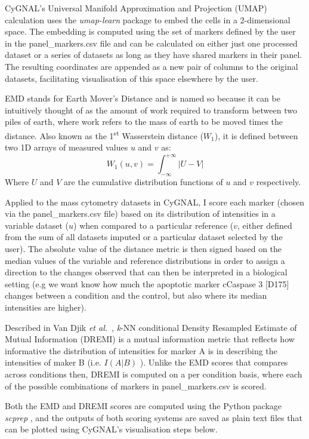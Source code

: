 CyGNAL’s Universal Manifold Approximation and Projection (UMAP) calculation uses the \emph{umap-learn} package \cite{mcinnes_umap_2020} to embed the cells in a 2-dimensional space. The embedding is computed using the set of markers defined by the user in the panel\_markers.csv file and can be calculated on either just one processed dataset or a series of datasets as long as they have shared markers in their panel. The resulting coordinates are appended as a new pair of columns to the original datasets, facilitating visualisation of this space elsewhere by the user.

EMD stands for Earth Mover's Distance and is named so because it can be intuitively thought of as the amount of work required to transform between two piles of earth, where work refers to the mass of earth to be moved times the distance. Also known as the 1\textsuperscript{st} Wasserstein distance (\(W_1\)), it is defined between two 1D arrays of measured values \(u\) and \(v\) as:
\[W_1(u, v) = \int_{-\infty}^{+\infty} |U-V|\]
Where \(U\) and \(V\) are the cumulative distribution functions of \(u\) and \(v\) respectively.

Applied to the mass cytometry datasets in CyGNAL, I score each marker (chosen via the panel\_markers.csv file) based on its distribution of intensities in a variable dataset (\(u\)) when compared to a particular reference (\(v\), either defined from the sum of all datasets imputed or a particular dataset selected by the user). The absolute value of the distance metric is then signed based on the median values of the variable and reference distributions in order to assign a direction to the changes observed that can then be interpreted in a biological setting (e.g we want know how much the apoptotic marker cCaspase 3 [D175] changes between a condition and the control, but also where its median intensities are higher).

Described in Van Djik \emph{et al.}~\cite{van_dijk_recovering_2018}, \emph{k}-NN conditional Density Resampled Estimate of Mutual Information (DREMI) is a mutual information metric that reflects how informative the distribution of intensities for marker A is in describing the intensities of maker B (i.e. \(I(A|B)\) ). Unlike the EMD scores that compares across conditions then, DREMI is computed on a per condition basis, where each of the possible combinations of markers in panel\_markers.csv is scored.

Both the EMD and DREMI scores are computed using the Python package \emph{scprep} \cite{noauthor_krishnaswamylabscprep_2021}, and the outputs of both scoring systems are saved as plain text files that can be plotted using CyGNAL’s visualisation steps below.

